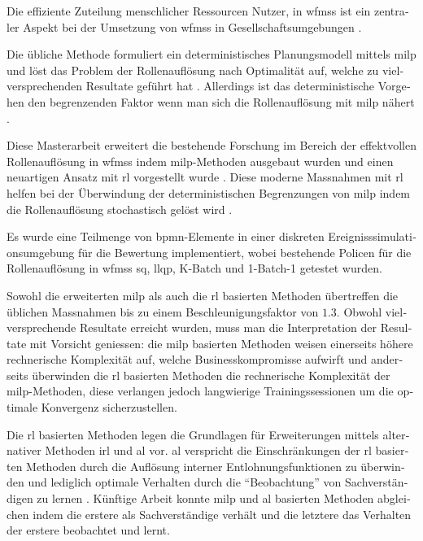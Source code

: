 \begin{otherlanguage}{ngerman}
	\begin{zusammenfassung}
	Die effiziente Zuteilung menschlicher Ressourcen \dhg Nutzer, in \glspl{wfms} ist ein zentraler Aspekt bei der Umsetzung von \glspl{wfms} in Gesellschaftsumgebungen \citep{Cheng2000,Mentzas2001}.

	Die übliche Methode formuliert ein deterministisches Planungsmodell mittels \gls{milp} und löst das Problem der Rollenauflösung nach Optimalität auf, welche zu vielversprechenden Resultate geführt hat \citep{Zeng2005}. Allerdings ist das deterministische Vorgehen den begrenzenden Faktor wenn man sich die Rollenauflösung mit \gls{milp} nähert \citep{Zeng2005}.

	Diese Masterarbeit erweitert die bestehende Forschung im Bereich der effektvollen Rollenauflösung in \glspl{wfms} indem \gls{milp}-Methoden ausgebaut wurden und einen neuartigen Ansatz mit \gls{rl} vorgestellt wurde \citep{Sutton2017}. Diese moderne Massnahmen mit \gls{rl} helfen bei der Überwindung der deterministischen Begrenzungen von \gls{milp} indem die Rollenauflösung stochastisch gelöst wird \citep{Sutton2017}.

	Es wurde eine Teilmenge von \gls{bpmn}-Elemente in einer diskreten Ereignisssimulationsumgebung für die Bewertung implementiert, wobei bestehende Policen für die Rollenauflösung in \glspl{wfms} \zbg \gls{sq}, \gls{llqp}, K-Batch und 1-Batch-1 getestet wurden.

	Sowohl die erweiterten \gls{milp} als auch die \gls{rl} basierten Methoden übertreffen die üblichen Massnahmen bis zu einem Beschleunigungsfaktor von $1.3$. Obwohl vielversprechende Resultate erreicht wurden, muss man die Interpretation der Resultate mit Vorsicht geniessen: die \gls{milp} basierten Methoden weisen einerseits höhere rechnerische Komplexität auf, welche Businesskompromisse aufwirft und anderseits überwinden die \gls{rl} basierten Methoden die rechnerische Komplexität der \gls{milp}-Methoden, diese verlangen jedoch langwierige Trainingssessionen um die optimale Konvergenz sicherzustellen.

	Die \gls{rl} basierten Methoden legen die Grundlagen für Erweiterungen mittels alternativer Methoden \zbg \gls{irl} \citep{Ng2000} und \gls{al} \citep{Abbeel2004} vor. \gls{al} verspricht die Einschränkungen der \gls{rl} basierten Methoden durch die Auflösung interner Entlohnungsfunktionen zu überwinden und lediglich optimale Verhalten durch die ``Beobachtung'' von Sachverständigen zu lernen \citep{Abbeel2004}. Künftige Arbeit konnte \gls{milp} und \gls{al} basierten Methoden abgleichen indem die erstere als Sachverständige verhält und die letztere das Verhalten der erstere beobachtet und lernt.
	\end{zusammenfassung}
\end{otherlanguage}